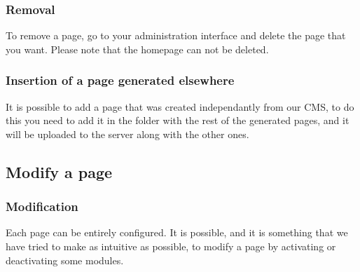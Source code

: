 \documentclass{article}
\begin{document}
\subsubsection{Removal}
To remove a page, go to your administration interface and delete the page that you want. 
Please note that the homepage can not be deleted. 
\subsubsection{Insertion of a page generated elsewhere}
It is possible to add a page that was created independantly from our CMS, to do this you need to add it in the folder with the rest of the generated pages, and it will be uploaded to the server along with the other ones. 
\subsection{Modify a page}
\subsubsection{Modification}
Each page can be entirely configured. It is possible, and it is something that we have tried to make as intuitive as possible, to modify a page by activating or deactivating some modules. 
\end{document}
